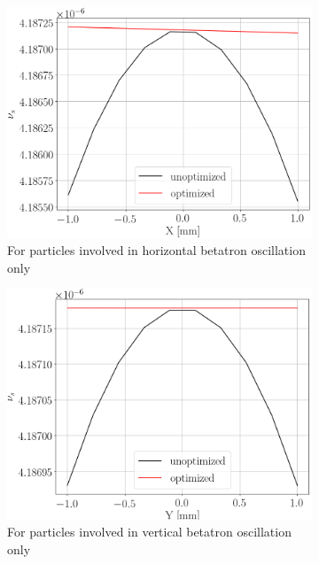 \documentclass[a4paper]{jacow}
\newcommand{\subwidth}{.9\linewidth}
\begin{document}
\begin{figure}[ht]
  \centering
  \begin{subfigure}{\subwidth}
    \centering
    \includegraphics[width=\linewidth]{../img/IPAC19/spin_tune_decoh_x_offset}
    \caption{For particles involved in horizontal betatron oscillation only\label{fig:st_decoh_horizontal}}
  \end{subfigure}
  \begin{subfigure}{\subwidth}
    \centering
    \includegraphics[width=\linewidth]{../img/IPAC19/spin_tune_decoh_y_offset}
    \caption{For particles involved in vertical betatron oscillation only}
  \end{subfigure}
  \begin{subfigure}{\subwidth}

\end{subfigure}
\end{figure}
\end{document}
